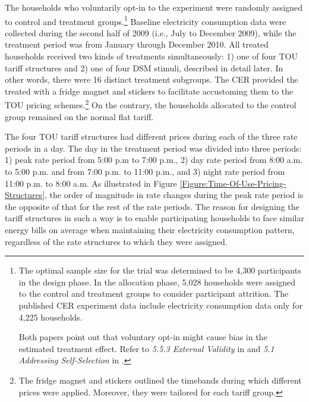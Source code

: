 
The households who voluntarily opt-in to the experiment were randomly assigned to control and treatment groups.\footnote{The optimal sample size for the trial was determined to be 4,300 participants in the design phase. In the allocation phase, 5,028 households were assigned to the control and treatment groups to consider participant attrition. The published CER experiment data include electricity consumption data only for 4,225 households. \par Both papers point out that voluntary opt-in might cause bias in the estimated treatment effect. Refer to \textit{5.5.3 External Validity} in \cite{Peaking-Interest:How-Awareness-Drives-the-Effectiveness-of-Time-of-Use-Electricity-Pricing_Prest_2020} and \textit{5.1 Addressing Self-Selection} in \cite{The-Effect-of-Information-on-TOU-Electricity-Use:An-Irish-Residential-Study_Pon_2017}. } Baseline electricity consumption data were collected during the second half of 2009 (i.e., July to December 2009), while the treatment period was from January through December 2010. All treated households received two kinds of treatments simultaneously: 1) one of four TOU tariff structures and 2) one of four DSM stimuli, described in detail later. In other words, there were 16 distinct treatment subgroups. The CER provided the treated with a fridge magnet and stickers to facilitate accustoming them to the TOU pricing schemes.\footnote{The fridge magnet and stickers outlined the timebands during which different prices were applied. Moreover, they were tailored for each tariff group.} On the contrary, the households allocated to the control group remained on the normal flat tariff.

The four TOU tariff structures had different prices during each of the three rate periods in a day. The day in the treatment period was divided into three periods: 1) peak rate period from 5:00 p.m to 7:00 p.m., 2) day rate period from 8:00 a.m. to 5:00 p.m. and from 7:00 p.m. to 11:00 p.m., and 3) night rate period from 11:00 p.m. to 8:00 a.m. As illustrated in Figure \ref{Figure:Time-Of-Use-Pricing-Structures}, the order of magnitude in rate changes during the peak rate period is the opposite of that for the rest of the rate periods. The reason for designing the tariff structures in such a way is to enable participating households to face similar energy bills on average when maintaining their electricity consumption pattern, regardless of the rate structures to which they were assigned. 

